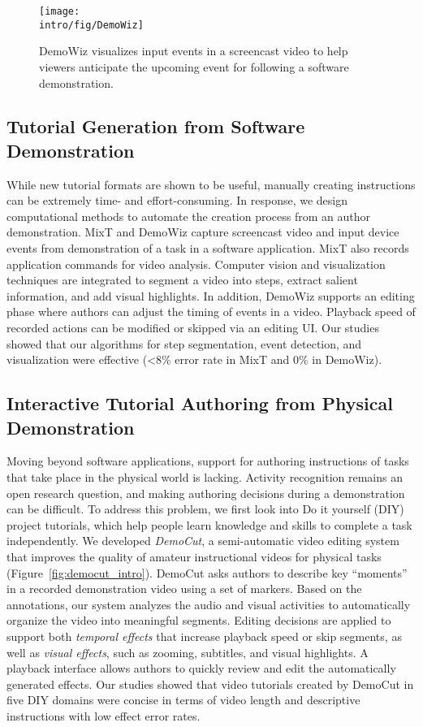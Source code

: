 \begin{figure*}[t]
\centering
\texttt{[image: \\intro/fig/DemoWiz]}
\caption{DemoWiz visualizes input events in a screencast video to help viewers anticipate the upcoming event for following a software demonstration.}
\label{fig:demowiz_intro}
\end{figure*}

\subsection{Tutorial Generation from Software Demonstration}

While new tutorial formats are shown to be useful, manually creating instructions can be extremely time- and effort-consuming. In response, we design computational methods to automate the creation process from an author demonstration. MixT and DemoWiz capture screencast video and input device events from demonstration of a task in a software application. MixT also records application commands for video analysis. Computer vision and visualization techniques are integrated to segment a video into steps, extract salient information, and add visual highlights.
%
In addition, DemoWiz supports an editing phase where authors can adjust the timing of events in a video. Playback speed of recorded actions can be modified or skipped via an editing UI. Our studies showed that our algorithms for step segmentation, event detection, and visualization were effective (\textless8\% error rate in MixT and 0\% in DemoWiz).

\subsection{Interactive Tutorial Authoring from Physical Demonstration}


Moving beyond software applications, support for authoring instructions of tasks that take place in the physical world is lacking. Activity recognition remains an open research question, and making authoring decisions during a demonstration can be difficult.
%
To address this problem, we first look into Do it yourself (DIY) project tutorials, which help people learn knowledge and skills to complete a task independently.
%
We developed \emph{DemoCut}, a semi-automatic video editing system that improves the quality of amateur instructional videos for physical tasks (Figure~\ref{fig:democut_intro}). DemoCut asks authors to describe key ``moments'' in a recorded demonstration video using a set of markers. Based on the annotations, our system analyzes the audio and visual activities to automatically organize the video into meaningful segments. Editing decisions are applied to support both \emph{temporal effects} that increase playback speed or skip segments, as well as \emph{visual effects}, such as zooming, subtitles, and visual highlights. A playback interface allows authors to quickly review and edit the automatically generated effects.
%
Our studies showed that video tutorials created by DemoCut in five DIY domains were concise in terms of video length and descriptive instructions with low effect error rates.

